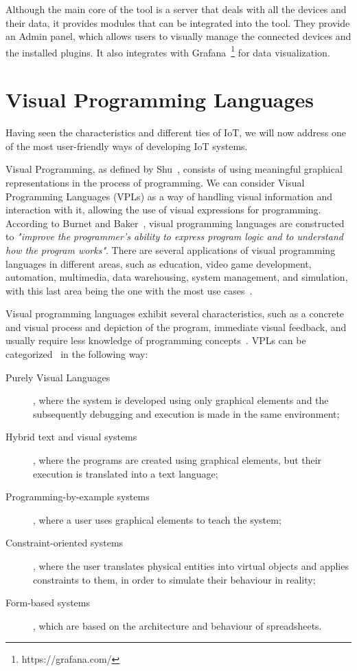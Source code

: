Although the main core of the tool is a server that deals with all the devices and their data, it provides modules that can be integrated into the tool. They provide an Admin panel, which allows users to visually manage the connected devices and the installed plugins. It also integrates with Grafana~\footnote{https://grafana.com/} for data visualization. 

\section{Visual Programming Languages}\label{sec:background_vpl}

Having seen the characteristics and different ties of IoT, we will now address one of the most user-friendly ways of developing IoT systems.

Visual Programming, as defined by Shu~\cite{vpl_definition_shu}, consists of using meaningful graphical representations in the process of programming. We can consider Visual Programming Languages (VPLs) as a way of handling visual information and interaction with it, allowing the use of visual expressions for programming. According to Burnet and Baker~\cite{scaling_vpls}, visual programming languages are constructed to \emph{ "improve the programmer's ability to express program logic and to understand how the program works"}. There are several applications of visual programming languages in different areas, such as education, video game development, automation, multimedia, data warehousing, system management, and simulation, with this last area being the one with the most use cases~\cite{survey_vpl_iot}.

Visual programming languages exhibit several characteristics, such as a concrete and visual process and depiction of the program, immediate visual feedback, and usually require less knowledge of programming concepts~\cite{scaling_vpls}. VPLs can be categorized~\cite{vpls_survey} in the following way: 
\begin{description}
    \item[Purely Visual Languages], where the system is developed using only graphical elements and the subsequently debugging and execution is made in the same environment;
    \item[Hybrid text and visual systems], where the programs are created using graphical elements, but their execution is translated into a text language;
    \item[Programming-by-example systems], where a user uses graphical elements to teach the system;
    \item[Constraint-oriented systems], where the user translates physical entities into virtual objects and applies constraints to them, in order to simulate their behaviour in reality;
    \item[Form-based systems], which are based on the architecture and behaviour of spreadsheets.
\end{description}

